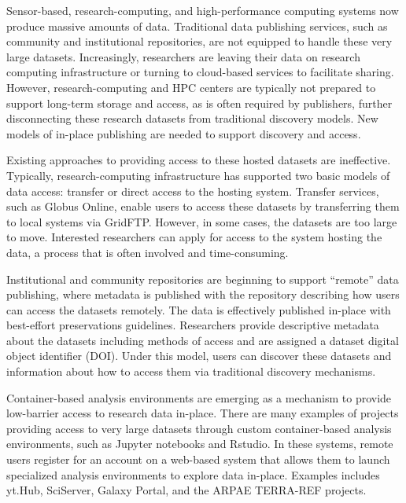 \documentclass{sig-alternate}
\begin{document}
Sensor-based, research-computing, and high-performance computing systems now produce massive amounts of data.  Traditional data publishing services, such as community and institutional repositories, are not equipped to handle these very large datasets.  Increasingly, researchers are leaving their data on research computing infrastructure or turning to cloud-based services to facilitate sharing. However, research-computing and HPC centers are typically not prepared to support long-term storage and access, as is often required by publishers, further disconnecting these research datasets from traditional discovery models. New models of in-place publishing are needed to support discovery and access.

Existing approaches to providing access to these hosted datasets are ineffective.  Typically, research-computing infrastructure has supported two basic models of data access: transfer or direct access to the hosting system.  Transfer services, such as Globus Online, enable users to access these datasets by transferring them to local systems via GridFTP.  However, in some cases, the datasets are too large to move.  Interested researchers can apply for access to the system hosting the data, a process that is often involved and time-consuming.

Institutional and community repositories are beginning to support ``remote'' data publishing, where metadata is published with the repository describing how users can access the datasets remotely.  The data is effectively published in-place with best-effort preservations guidelines. Researchers provide descriptive metadata about the datasets including methods of access and are assigned a dataset digital object identifier (DOI).  Under this model, users can discover these datasets and information about how to access them via traditional discovery mechanisms. 

Container-based analysis environments are emerging as a mechanism to provide low-barrier access to research data in-place. There are many examples of projects providing access to very large datasets through custom container-based analysis environments, such as Jupyter notebooks and Rstudio.  In these systems, remote users register for an account on a web-based system that allows them to launch specialized analysis environments to explore data in-place.  Examples includes yt.Hub, SciServer, Galaxy Portal, and the ARPAE TERRA-REF projects. 


\end{document}
